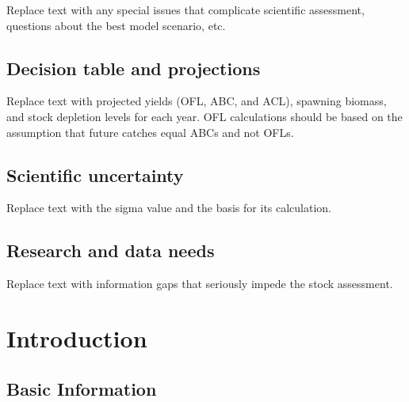 \documentclass[11pt,
  english,
  letterpaper,
]{article}
\begin{document}
Replace text with any special issues that complicate scientific assessment, questions about the best model scenario, etc.

\hypertarget{decision-table-and-projections}{%
\subsection*{Decision table and projections}\label{decision-table-and-projections}}

Replace text with projected yields (OFL, ABC, and ACL), spawning biomass, and stock depletion levels for each year. OFL calculations should be based on the assumption that future catches equal ABCs and not OFLs.

\hypertarget{scientific-uncertainty}{%
\subsection*{Scientific uncertainty}\label{scientific-uncertainty}}

Replace text with the sigma value and the basis for its calculation.

\hypertarget{research-and-data-needs}{%
\subsection*{Research and data needs}\label{research-and-data-needs}}

Replace text with information gaps that seriously impede the stock assessment.

\pagebreak
\setlength{\parskip}{5mm plus1mm minus1mm}
\setcounter{page}{1}
\renewcommand{\thefigure}{\arabic{figure}}
\renewcommand{\thetable}{\arabic{table}}
\setcounter{table}{0}
\setcounter{figure}{0}

\hypertarget{introduction}{%
\section{Introduction}\label{introduction}}

\hypertarget{basic-information}{%
\subsection{Basic Information}\label{basic-information}}
\end{document}
